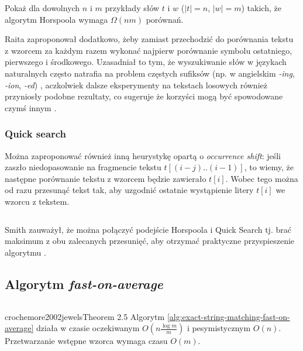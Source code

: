 \begin{problem}{}{}
  Pokaż dla dowolnych $n$ i $m$ przykłady słów $t$ i $w$ ($|t| = n$, $|w| = m$) takich, że algorytm Horspoola wymaga $\Omega(n m)$ porównań.
\end{problem}

Raita zaproponował dodatkowo, żeby zamiast przechodzić do porównania tekstu z wzorcem za każdym razem wykonać najpierw porównanie symbolu ostatniego, pierwszego i środkowego.
Uzasadniał to tym, że wyszukiwanie słów w językach naturalnych często natrafia na problem częstych sufiksów (np. w angielskim \emph{-ing}, \emph{-ion}, \emph{-ed}) \cite{raita1992tuning}, aczkolwiek dalsze eksperymenty na tekstach losowych również przyniosły podobne rezultaty, co sugeruje że korzyści mogą być spowodowane czymś innym \cite{smith1994tuning}.

\subsubsection{Quick search}

Można zaproponować również inną heurystykę opartą o \emph{occurrence shift}: jeśli zaszło niedopasowanie na fragmencie tekstu $t[(i - j)..(i - 1)]$, to wiemy, że następne porównanie tekstu z wzorcem będzie zawierało $t[i]$. Wobec tego można od razu przesunąć tekst tak, aby uzgodnić ostatnie wystąpienie litery $t[i]$ we wzorcu z tekstem.

\begin{code}
\inputminted{python}{code/exact-string-matching/quick-search.py}
\label{alg:exact-string-matching-quick-search}
\end{code}

Smith zauważył, że można połączyć podejście Horspoola i Quick Search tj. brać maksimum z obu zalecanych przesunięć, aby otrzymać praktyczne przyspieszenie algorytmu \cite{smith1991experiments}.

\subsection{Algorytm \emph{fast-on-average}}

\begin{code}
\inputminted{python}{code/exact-string-matching/fast-on-average.py}
\label{alg:exact-string-matching-fast-on-average}
\end{code}

\begin{theorem}{crochemore2002jewels}{Theorem 2.5}
  Algorytm \ref{alg:exact-string-matching-fast-on-average} działa w czasie oczekiwanym $O\left(n \frac{\log{m}}{m}\right)$ i pesymistycznym $O(n)$. Przetwarzanie wstępne wzorca wymaga czasu $O(m)$.
\end{theorem}

